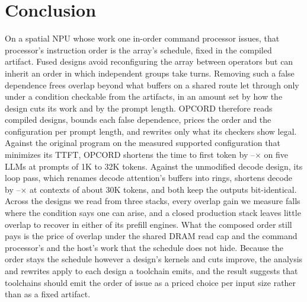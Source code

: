 \section{Conclusion}
\label{sec:conclusion}

On a spatial NPU whose work one in-order command processor issues, that processor's instruction order is the array's schedule, fixed in the compiled artifact.
Fused designs avoid reconfiguring the array between operators but can inherit an order in which independent groups take turns.
Removing such a false dependence frees overlap beyond what buffers on a shared route let through only under a condition checkable from the artifacts, in an amount set by how the design cuts its work and by the prompt length.
OPCORD therefore reads compiled designs, bounds each false dependence, prices the order and the configuration per prompt length, and rewrites only what its checkers show legal.
Against the original program on the measured supported configuration that minimizes its TTFT, OPCORD shortens the time to first token by \PrefillGainLo--\PrefillGainHi$\times$ on five LLMs at prompts of 1K to 32K tokens.
Against the unmodified decode design, its loop pass, which renames decode attention's buffers into rings, shortens decode by \DecodeGainLo--\DecodeGainHi$\times$ at contexts of about 30K tokens, and both keep the outputs bit-identical.
Across the designs we read from three stacks, every overlap gain we measure falls where the condition says one can arise, and a closed production stack leaves little overlap to recover in either of its prefill engines.
What the composed order still pays is the price of overlap under the shared DRAM read cap and the command processor's and the host's work that the schedule does not hide.
Because the order stays the schedule however a design's kernels and cuts improve, the analysis and rewrites apply to each design a toolchain emits, and the result suggests that toolchains should emit the order of issue as a priced choice per input size rather than as a fixed artifact.
